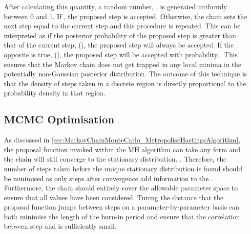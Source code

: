 After calculating this quantity, a random number, \quickmath{\beta}, is generated uniformly between 0 and 1. If , the proposed step is accepted. Otherwise, the chain sets the next step equal to the current step and this procedure is repeated. This can be interpreted as if the posterior probability of the proposed step is greater than that of the current step, (), the proposed step will always be accepted. If the opposite is true, (), the proposed step will be accepted with probability . This ensures that the Markov chain does not get trapped in any local minima in the potentially non-Gaussian posterior distribution. The outcome of this technique is that the density of steps taken in a discrete region is directly proportional to the probability density in that region.

\subsection{MCMC Optimisation}
\label{sec:MarkovChainMonteCarlo_MCMCOptimisation}
As discussed in \autoref{sec:MarkovChainMonteCarlo_MetropoliseHastingsAlgorithm}, the proposal function invoked within the MH algorithm can take any form and the chain will still converge to the stationary distribution.  . Therefore, the number of steps taken before the unique stationary distribution is found should be minimised as only steps after convergence add information to the  . Furthermore, the chain should entirely cover the allowable parameter space to ensure that all values have been considered. Tuning the distance that the proposal function jumps between steps on a parameter-by-parameter basis can both minimise the length of the burn-in period and ensure that the correlation between step  and  is sufficiently small.

